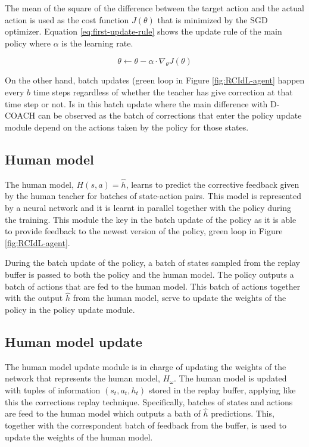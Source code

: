 The mean of the square of the difference between the target action and the actual action is used as the cost function $J(\theta)$ that is minimized by the SGD optimizer. Equation \eqref{eq:first-update-rule} shows the update rule of the main policy where $\alpha$ is the learning rate.


\begin{equation}
\theta \leftarrow \theta - \alpha \cdot \nabla_\theta J(\theta)
\label{eq:first-update-rule}
\end{equation}

On the other hand, batch updates (green loop in Figure \ref{fig:RCIdL-agent} happen every $b$ time steps regardless of whether the teacher has give correction at that time step or not. Is in this batch update where the main difference with D-COACH can be observed as the batch of corrections that enter the policy update module depend on the actions taken by the policy for those states.




\subsection*{Human model}
The human model, $H(s, a) = \hat{h}$, learns to predict the corrective feedback given by the human teacher for batches of state-action pairs. This model is represented by a neural network and it is learnt in parallel together with the policy during the training. This module the key in the batch update of the policy as it is able to provide feedback to the newest version of the policy, green loop in Figure \ref{fig:RCIdL-agent}.

During the batch update of the policy, a batch of states sampled from the replay buffer is passed to both the policy and the human model. The policy outputs a batch of actions that are fed to the human model. This batch of actions together with the output $\hat{h}$ from the human model, serve to update the weights of the policy in the policy update module. 



\subsection*{Human model update}

The human model update module is in charge of updating the weights of the network that represents the human model, $H_\omega$. The human model is updated with tuples of information $(s_t, a_t, h_t)$ stored in the replay buffer, applying like this the corrections replay technique. Specifically, batches of states and actions are feed to the human model which outputs a bath of $\hat{h}$ predictions. This, together with the correspondent batch of feedback from the buffer, is used to update the weights of the human model.

